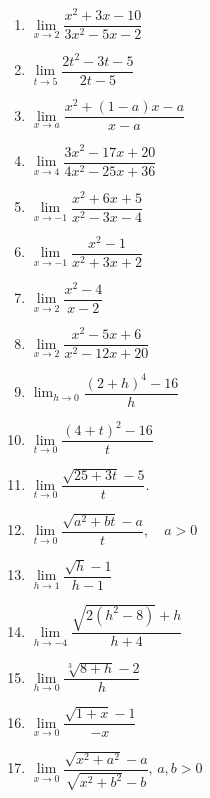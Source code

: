 \begin{enumerate}
\begin{multicols}{3}
\begin{enumerate}
    \item $ \lim\limits_{x\to2} \dfrac{x^2 + 3x- 10}{ 3x^2 - 5x - 2}$ 
    
    \item $\lim\limits_{t\to5} \dfrac{2t^2 -3t - 5} {2t - 5}$ 
    
    \item $\lim\limits_{x\to a} \dfrac{x^2 + (1 - a)x - a}{ x - a}$ 
    
    \item $ \lim\limits_{x\to4} \dfrac{3x^2 - 17x + 20}{ 4x^2 - 25x + 36}$ 
    
    \item $ \lim\limits_{x\to-1} \dfrac{x^2 + 6x + 5}{ x^2 - 3x - 4}$ 
    
    \item $ \lim\limits_{x\to-1} \dfrac{x^2 - 1}{ x^2 + 3x + 2} $
    
    \item $\lim\limits_{x\to 2}\dfrac{x^2 - 4}{ x - 2}$  
    
    \item $ \lim\limits_{x\to2} \dfrac{x^2 - 5x+ 6}{ x^2 - 12x + 20}$ 
    
    \item $\lim_{h\to 0} \dfrac{(2 + h)^4 - 16}{ h}$ 
    
    \item $ \lim\limits_{t\to0} \dfrac{(4 + t)^2- 16}{ t}$
    
    \item $\lim\limits_{t\to 0} \dfrac{\displaystyle\sqrt{25 + 3t} - 5}{ t}.$ 
    
    \item $\lim\limits_{t\to 0}\dfrac{\displaystyle\sqrt{a^2 + bt} -a }{t},\quad a
    > 0 $ 
    \item $\lim\limits_{h\to 1}\dfrac{\displaystyle\sqrt{h} - 1}{ h - 1}$
    
    \item $\lim\limits_{h\to-4} \dfrac{\displaystyle\sqrt{ 2(h^2 - 8)} + h}{ h + 4} $ 
    
    \item $\lim\limits_{h\to0} \dfrac{\displaystyle\sqrt[3]{ 8 + h}-2 }{h} $
    
    \item $\lim\limits_{x\to0}\dfrac{\displaystyle\sqrt{1 + x}-1}{-x} $ 
     
     \item $\lim\limits_{x\to0}\dfrac{ \displaystyle\sqrt{x^2 + a^2} -a }{ \displaystyle\sqrt{x^2 + b^2}- b},\, a,b > 0$ 
    

\end{enumerate}
\end{multicols}
\end{enumerate}
